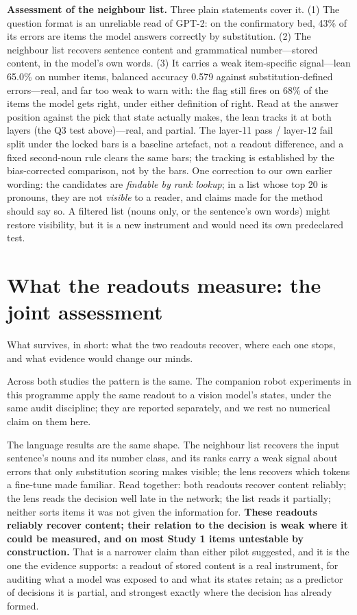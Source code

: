 \documentclass[11pt]{article}
\begin{document}
\textbf{Assessment of the neighbour list.} Three plain statements
cover it. (1) The question format is an unreliable read of GPT-2: on
the confirmatory bed, 43\% of its errors are items the model answers
correctly by substitution. (2) The neighbour list recovers sentence
content and grammatical number---stored content, in the model's own
words. (3) It carries a weak item-specific signal---lean 65.0\% on
number items, balanced accuracy 0.579 against substitution-defined
errors---real, and far too weak to warn with: the flag still fires on 68\% of the items the model gets right, under either definition of right. Read at the answer position against the pick that state actually makes, the lean tracks it at both layers (the Q3 test above)---real, and partial. The layer-11 pass / layer-12 fail split under the locked bars is a baseline artefact, not a readout difference, and a fixed second-noun rule clears the same bars; the tracking is established by the bias-corrected comparison, not by the bars. One correction to our
own earlier wording: the candidates are \emph{findable by rank
lookup}; in a list whose top 20 is pronouns, they are not
\emph{visible} to a reader, and claims made for the method should say
so. A filtered list (nouns only, or the sentence's own words) might
restore visibility, but it is a new instrument and would need its own
predeclared test.

\section{What the readouts measure: the joint assessment}
\label{sec:assessment}

What survives, in short: what the two readouts recover, where each
one stops, and what evidence would change our minds.


Across both studies the pattern is the same. The companion robot experiments in this programme apply the same readout to a vision model's states, under the same audit discipline; they are reported separately, and we rest no numerical claim on them here.

The language results are the same shape. The neighbour list recovers
the input sentence's nouns and its number class, and its ranks carry
a weak signal about errors that only substitution scoring makes
visible; the lens recovers
which tokens a fine-tune made familiar. Read together: both readouts recover content reliably; the lens reads the decision well late in the network; the list reads it partially; neither sorts items it was not given the information for. \textbf{These readouts reliably recover content; their relation to the decision is weak where it could be measured, and on most Study 1 items untestable by construction.} That is a narrower claim than either pilot suggested, and it is the one the evidence supports: a readout of stored content is a real instrument, for auditing what a model was exposed to and what its states retain; as a predictor of decisions it is partial, and strongest exactly where the decision has already formed.
\end{document}
